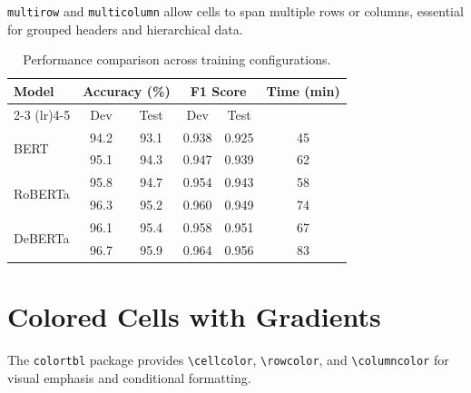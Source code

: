 \documentclass[
    language=english,
    doctype=article,
    institution=none,
]{../../omnilatex}
\begin{document}
\texttt{multirow} and \texttt{multicolumn} allow cells to span multiple rows or
columns, essential for grouped headers and hierarchical data.

\begin{table}[htbp]
    \centering
    \caption{Performance comparison across training configurations.}
    \label{tab:multirow}
    \begin{tabular}{lccccc}
        \toprule
        \multirow{2}{*}{\textbf{Model}} &
        \multicolumn{2}{c}{\textbf{Accuracy (\%)}} &
        \multicolumn{2}{c}{\textbf{F1 Score}} &
        \multirow{2}{*}{\textbf{Time (min)}} \\
        \cmidrule(lr){2-3} \cmidrule(lr){4-5}
        & Dev & Test & Dev & Test & \\
        \midrule
        \multirow{2}{*}{BERT}
        & 94.2 & 93.1 & 0.938 & 0.925 & 45 \\
        & 95.1 & 94.3 & 0.947 & 0.939 & 62 \\
        \midrule
        \multirow{2}{*}{RoBERTa}
        & 95.8 & 94.7 & 0.954 & 0.943 & 58 \\
        & 96.3 & 95.2 & 0.960 & 0.949 & 74 \\
        \midrule
        \multirow{2}{*}{DeBERTa}
        & 96.1 & 95.4 & 0.958 & 0.951 & 67 \\
        & 96.7 & 95.9 & 0.964 & 0.956 & 83 \\
        \bottomrule
    \end{tabular}
\end{table}

\section{Colored Cells with Gradients}
\label{sec:colored-cells}

The \texttt{colortbl} package provides \verb|\cellcolor|, \verb|\rowcolor|, and
\verb|\columncolor| for visual emphasis and conditional formatting.
\end{document}
